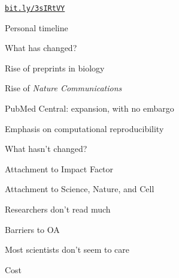 \documentclass[aspectratio=169,12pt,t]{beamer}
\begin{document}
\begin{frame}[c]{}
  \vspace{8pt}

  \centerline{}

  \vfill
  \hfill
  \href{https://bit.ly/3sIRtVY}{\tt \footnotesize \lolit bit.ly/3sIRtVY}

\end{frame}


\begin{frame}[c]{Personal timeline}


  \note{
  }
\end{frame}


\begin{frame}{What has changed?}

  \bbi
\item Rise of preprints in biology
\item Rise of \emph{Nature Communications}
\item PubMed Central: expansion, with no embargo
\item Emphasis on computational reproducibility
  \ei

  \note{
  }
\end{frame}


\begin{frame}{What hasn't changed?}

  \bbi
\item Attachment to Impact Factor
\item Attachment to Science, Nature, and Cell
\item Researchers don't read much
  \ei

\end{frame}


\begin{frame}{Barriers to OA}

  \bbi
\item Most scientists don't seem to care
\item Cost
  \ei

  \note{
  }
\end{frame}
\end{document}
